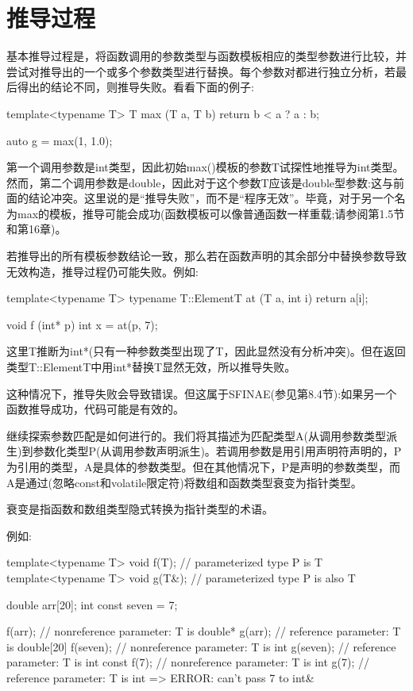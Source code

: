 \section{推导过程}
基本推导过程是，将函数调用的参数类型与函数模板相应的类型参数进行比较，并尝试对推导出的一个或多个参数类型进行替换。每个参数对都进行独立分析，若最后得出的结论不同，则推导失败。看看下面的例子:
 
\begin{cpp}
template<typename T>
T max (T a, T b)
{
	return b < a ? a : b;
}

auto g = max(1, 1.0);
\end{cpp} 
 
第一个调用参数是int类型，因此初始max()模板的参数T试探性地推导为int类型。然而，第二个调用参数是double，因此对于这个参数T应该是double型参数:这与前面的结论冲突。这里说的是“推导失败”，而不是“程序无效”。毕竟，对于另一个名为max的模板，推导可能会成功(函数模板可以像普通函数一样重载;请参阅第1.5节和第16章)。
 
若推导出的所有模板参数结论一致，那么若在函数声明的其余部分中替换参数导致无效构造，推导过程仍可能失败。例如:

\begin{cpp}
template<typename T>
typename T::ElementT at (T a, int i)
{
	return a[i];
}

void f (int* p)
{
	int x = at(p, 7);
}
\end{cpp} 

这里T推断为int*(只有一种参数类型出现了T，因此显然没有分析冲突)。但在返回类型T::ElementT中用int*替换T显然无效，所以推导失败。

\begin{notice}
这种情况下，推导失败会导致错误。但这属于SFINAE(参见第8.4节):如果另一个函数推导成功，代码可能是有效的。
\end{notice}

继续探索参数匹配是如何进行的。我们将其描述为匹配类型A(从调用参数类型派生)到参数化类型P(从调用参数声明派生)。若调用参数是用引用声明符声明的，P为引用的类型，A是具体的参数类型。但在其他情况下，P是声明的参数类型，而A是通过(忽略const和volatile限定符)将数组和函数类型衰变为指针类型。

\begin{notice}
衰变是指函数和数组类型隐式转换为指针类型的术语。
\end{notice}

例如:

\begin{cpp}
template<typename T> void f(T); // parameterized type P is T
template<typename T> void g(T&); // parameterized type P is also T

double arr[20];
int const seven = 7;

f(arr); // nonreference parameter: T is double*
g(arr); // reference parameter: T is double[20]
f(seven); // nonreference parameter: T is int
g(seven); // reference parameter: T is int const
f(7); // nonreference parameter: T is int
g(7); // reference parameter: T is int => ERROR: can’t pass 7 to int&
\end{cpp} 

